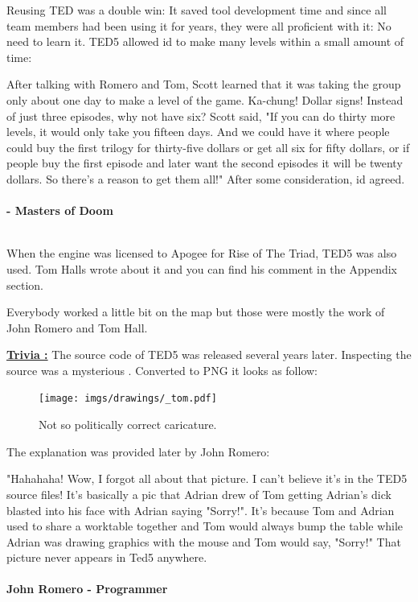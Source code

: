 \documentclass[book.tex]{subfiles}
\begin{document}
Reusing TED was a double win: It saved tool development time and since all team members had been using it for years, they were all proficient with it: No need to learn it. TED5 allowed id to make many levels within a small amount of time:\\
\par

 \begin{fancyquotes}
After talking with Romero and Tom, Scott learned that it was taking the group only about one day to make a level of the game. Ka-chung! Dollar signs! Instead of just three episodes, why not have six? Scott said, "If you can do thirty more levels, it would only take you fifteen days. And we could have it where people could buy the first trilogy for thirty-five dollars or get all six for fifty dollars, or if people buy the first episode and later want the second episodes it will be twenty dollars. So there's a reason to get them all!" After some consideration, id agreed.\\
\\
 \textbf{- Masters of Doom}
 \end{fancyquotes}\\

 When the engine was licensed to Apogee for Rise of The Triad, TED5 was also used. Tom Halls wrote about it and you can find his comment in the Appendix section.\\
\par
Everybody worked a little bit on the map but those were mostly the work of John Romero and Tom Hall.\\
\par
 \textbf{\underline{Trivia :}} The source code of TED5 was released several years later. Inspecting the source was a mysterious . Converted to PNG it looks as follow:\\
\begin{figure}[H]
\centering
 \texttt{[image: imgs/drawings/\_tom.pdf]}
 \caption{Not so politically correct caricature.} 
 \end{figure}
The explanation was provided later by John Romero:\\
 \begin{fancyquotes}
   "Hahahaha! Wow, I forgot all about that picture. I can't believe it's 
in the TED5 source files! It's basically a pic that Adrian drew of Tom 
getting Adrian's dick blasted into his face with Adrian saying "Sorry!". 
It's because Tom and Adrian used to share a worktable together and Tom 
would always bump the table while Adrian was drawing graphics with the 
mouse and Tom would say, "Sorry!" That picture never appears in Ted5 
anywhere.\\
   \\
\textbf{John Romero - Programmer}
 \end{fancyquotes}\\
\end{document}
